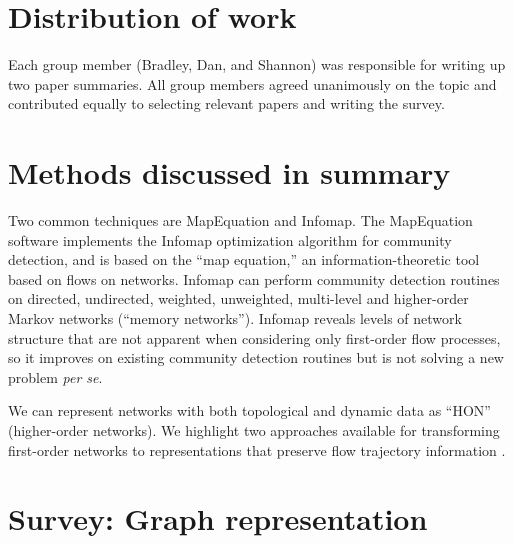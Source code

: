 \documentclass[sigconf]{acmart}
\begin{document}
\section{Distribution of work}
Each group member (Bradley, Dan, and Shannon) was responsible for writing up two paper summaries. All group members agreed unanimously on the topic and contributed equally to selecting relevant papers and writing the survey. %

\section{Methods discussed in summary}

Two common techniques are MapEquation and Infomap. The MapEquation software implements the Infomap optimization algorithm for community detection, and is based on the ``map equation,'' an information-theoretic tool based on flows on networks. Infomap can perform community detection routines on directed, undirected, weighted, unweighted, multi-level and higher-order Markov networks (``memory networks''). Infomap reveals levels of network structure that are not apparent when considering only first-order flow processes, so it improves on existing community detection routines but is not solving a new problem \textit{per se}.

We can represent networks with both topological and dynamic data as ``HON'' (higher-order networks). We highlight two approaches available for transforming first-order networks to representations that preserve flow trajectory information \cite{Xu2016,Scholtes2017}.


\section{Survey: Graph representation}
\end{document}
